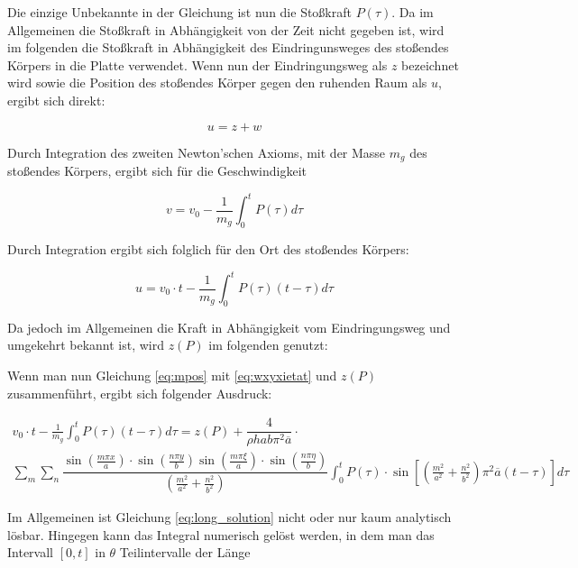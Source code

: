Die einzige Unbekannte in der Gleichung ist nun die Stoßkraft $P(\tau)$. Da im Allgemeinen die Stoßkraft in Abhängigkeit von der Zeit nicht gegeben ist, wird im folgenden die Stoßkraft in Abhängigkeit des Eindringunsweges des stoßendes Körpers in die Platte verwendet. Wenn nun der Eindringungsweg als $z$ bezeichnet wird sowie die Position des stoßendes Körper gegen den ruhenden Raum als $u$, ergibt sich direkt:

\begin{equation}
	u = z + w
\end{equation}


Durch Integration des zweiten Newton'schen Axioms, mit der Masse $m_g$ des stoßendes Körpers, ergibt sich für die Geschwindigkeit 

\begin{equation}
	v = v_0 - \frac{1}{m_g} \int_0^t P(\tau) d\tau
\end{equation}

Durch Integration ergibt sich folglich für den Ort des stoßendes Körpers:

\begin{equation}
	u = v_0 \cdot t - \frac{1}{m_g} \int_0^t P(\tau) (t-\tau) d\tau
	\label{eq:mpos}
\end{equation}


Da jedoch im Allgemeinen die Kraft in Abhängigkeit vom Eindringungsweg und umgekehrt bekannt ist, wird $z(P)$ im folgenden genutzt:

Wenn man nun Gleichung \ref{eq:mpos} mit \ref{eq:wxyxietat} und $z(P)$ zusammenführt, ergibt sich folgender Ausdruck:


\begin{multline}
v_0 \cdot t - \frac{1}{m_g} \int_0^t P(\tau) (t-\tau) d\tau = z(P) + \dfrac{4}{\rho h a b \pi^2 \overline{a}} \cdot  \\  \sum_m \sum_n 
\dfrac{{\sin\left(\frac{m \pi x}{a}\right) \cdot \sin\left(\frac{n \pi y}{b}\right) \sin\left(\frac{m \pi \xi}{a}\right) \cdot \sin\left(\frac{n \pi \eta}{b}\right)	}}{\left(\frac{m^2}{a^2} + \frac{n^2}{b^2} \right)} 
\int_0^t
P(\tau)\cdot \sin \left[ \left(\frac{m^2}{a^2} + \frac{n^2}{b^2} \right) \pi^2 \overline{a} (t-\tau)\right] d\tau
\label{eq:long_solution}
\end{multline}

Im Allgemeinen ist Gleichung \ref{eq:long_solution} nicht oder nur kaum analytisch lösbar. Hingegen kann das Integral numerisch gelöst werden, in dem man das Intervall $\left[ 0,t \right]$ in $\theta$ Teilintervalle der Länge

